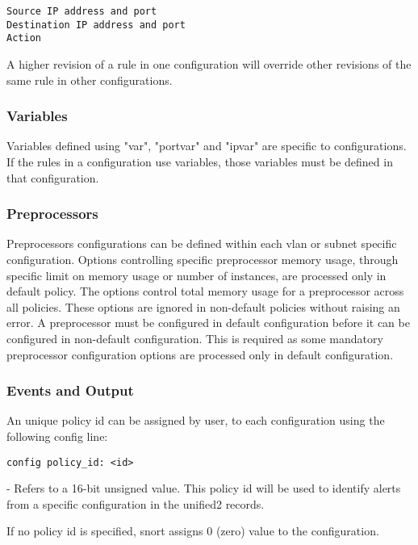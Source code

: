 \documentclass[english]{report}
\newenvironment{note}{
\samepage
    \vspace{10pt}{\textsf{
        {\hspace{7pt}\Huge{$\triangle$\hspace{-12.5pt}{\Large{$^!$}}}}\hspace{5pt}
        {\Large{NOTE}}
    }
    }
   \begin{center}
    \par\vspace{-17pt}

    \begin{lrbox}{\savepar}
    \begin{minipage}[r]{6in}
}
{
    \end{minipage}
    \end{lrbox}
    \fbox{
        \usebox{
            \savepar
	}
    }
    \par\vskip10pt
    \end{center}
}
\newenvironment{note}{
        \begin{rawhtml}
        <p><table border="1"><tr><td><b>
        Note:&nbsp;&nbsp;</b>
        \end{rawhtml}
}{
        \begin{rawhtml}
        </b></td></tr></table></p>
        \end{rawhtml}
}
\begin{document}
\begin{verbatim}
Source IP address and port
Destination IP address and port
Action
\end{verbatim}

A higher revision of a rule in one configuration will override other revisions of 
the same rule in other configurations.

\subsubsection{Variables}
Variables defined using "var", "portvar" and "ipvar" are specific to configurations. 
If the rules in a configuration use variables, those variables must be defined in 
that configuration. 

\subsubsection{Preprocessors}
Preprocessors configurations can be defined within each vlan or subnet specific 
configuration. Options controlling specific preprocessor memory usage, through specific 
limit on memory usage or number of instances, are processed only in default policy. 
The options control total memory usage for a preprocessor across all policies. These 
options are ignored in non-default policies without raising an error. A preprocessor 
must be configured in default configuration before it can be configured in non-default 
configuration. This is required as some mandatory preprocessor configuration options 
are processed only in default configuration.

\subsubsection{Events and Output}
An unique policy id can be assigned by user, to each configuration using the following 
config line:

\begin{verbatim}
config policy_id: <id>
\end{verbatim}

\begin{description}{}
\item [\texttt{id}] - Refers to a 16-bit unsigned value. This policy id will be used to 
identify alerts from a specific configuration in the unified2 records.
\end{description}

\begin{note}
If no policy id is specified, snort assigns 0 (zero) value to the configuration.
\end{note}
\end{document}
